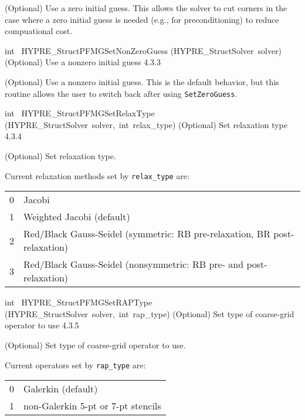 \documentclass{article}
\begin{document}
\begin{cxxentry}
\begin{cxxentry}
\begin{cxxfunction}
\begin{cxxdoc}
(Optional) Use a zero initial guess.  This allows the solver to cut corners
in the case where a zero initial guess is needed (e.g., for preconditioning)
to reduce compuational cost.
\end{cxxdoc}
\end{cxxfunction}
\begin{cxxfunction}
{int\ }
        {HYPRE\_StructPFMGSetNonZeroGuess}
        {(HYPRE\_StructSolver\ solver)}
        {
(Optional) Use a nonzero initial guess}
        {4.3.3}
\begin{cxxdoc}

(Optional) Use a nonzero initial guess.  This is the default behavior, but
this routine allows the user to switch back after using {\tt SetZeroGuess}.
\end{cxxdoc}
\end{cxxfunction}
\begin{cxxfunction}
{int\ }
        {HYPRE\_StructPFMGSetRelaxType}
        {(HYPRE\_StructSolver\ solver,\ int\ relax\_type)}
        {
(Optional) Set relaxation type}
        {4.3.4}
\begin{cxxdoc}

(Optional) Set relaxation type.

Current relaxation methods set by {\tt relax\_type} are:

\begin{tabular}{l@{ -- }l}
0 & Jacobi \\
1 & Weighted Jacobi (default) \\
2 & Red/Black Gauss-Seidel (symmetric: RB pre-relaxation, BR post-relaxation) \\
3 & Red/Black Gauss-Seidel (nonsymmetric: RB pre- and post-relaxation) \\
\end{tabular}
\end{cxxdoc}
\end{cxxfunction}
\begin{cxxfunction}
{int\ }
        {HYPRE\_StructPFMGSetRAPType}
        {(HYPRE\_StructSolver\ solver,\ int\ rap\_type)}
        {
(Optional) Set type of coarse-grid operator to use}
        {4.3.5}
\begin{cxxdoc}

(Optional) Set type of coarse-grid operator to use.

Current operators set by {\tt rap\_type} are:

\begin{tabular}{l@{ -- }l}
0 & Galerkin (default) \\
1 & non-Galerkin 5-pt or 7-pt stencils \\
\end{tabular}


\end{cxxdoc}
\end{cxxfunction}
\end{cxxentry}
\end{cxxentry}
\end{document}
